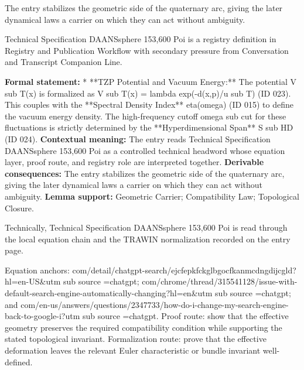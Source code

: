 The entry stabilizes the geometric side of the quaternary arc, giving the later dynamical laws a carrier on which they can act without ambiguity.
\clearpage


\begingroup\small
{}
Technical Specification DAANSsphere 153,600 Poi is a registry definition in Registry and Publication Workflow with secondary pressure from Conversation and Transcript Companion Line.

\begingroup\footnotesize\setlength{\emergencystretch}{3em}\sloppy
\textbf{Formal statement:} * **TZP Potential and Vacuum Energy:** The potential V sub T(x) is formalized as V sub T(x) = lambda exp(-d(x,p)/u sub T) (ID 023). This couples with the **Spectral Density Index** eta(omega) (ID 015) to define the vacuum energy density. The high-frequency cutoff omega sub cut for these fluctuations is strictly determined by the **Hyperdimensional Span** S sub HD (ID 024). \textbf{Contextual meaning:} The entry reads Technical Specification DAANSsphere 153,600 Poi as a controlled technical headword whose equation layer, proof route, and registry role are interpreted together. \textbf{Derivable consequences:} The entry stabilizes the geometric side of the quaternary arc, giving the later dynamical laws a carrier on which they can act without ambiguity. \textbf{Lemma support:} Geometric Carrier; Compatibility Law; Topological Closure.\par
\endgroup

Technically, Technical Specification DAANSsphere 153,600 Poi is read through the local equation chain and the TRAWIN normalization recorded on the entry page.

Equation anchors: com/detail/chatgpt-search/ejcfepkfckglbgocfkanmcdngdijcgld?hl=en-US\&utm sub source =chatgpt; com/chrome/thread/315541128/issue-with-default-search-engine-automatically-changing?hl=en\&utm sub source =chatgpt; and com/en-us/answers/questions/2347733/how-do-i-change-my-search-engine-back-to-google-i?utm sub source =chatgpt. Proof route: show that the effective geometry preserves the required compatibility condition while supporting the stated topological invariant. Formalization route: prove that the effective deformation leaves the relevant Euler characteristic or bundle invariant well-defined.

